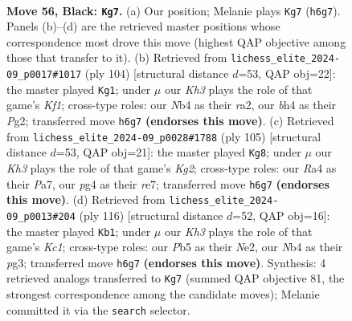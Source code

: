 \documentclass[11pt]{article}
\begin{document}
\clearpage

\begin{figure}[p]\centering
\begin{subfigure}{0.46\textwidth}\centering
\resizebox{\linewidth}{!}{%
\newchessgame
\chessboard[
  setfen={1R6/3b4/2r4k/1p6/rn4PB/1R2P2p/5P2/7K b - - 4 56},
  showmover=false,
  pgfstyle=straightmove, color=movearrow, markmove={h6-g7}
]}
\caption{}
\end{subfigure}\hfill
\begin{subfigure}{0.46\textwidth}\centering
\resizebox{\linewidth}{!}{%
\newchessgame
\chessboard[
  setfen={1b6/5r1k/R7/1P1p3p/3P3P/p2N4/r5P1/4RK2 w - - 3 53},
  showmover=false,
  pgfstyle=straightmove, color=movearrow, markmove={f1-g1}
]}
\caption{}
\end{subfigure}
\\[4pt]
\begin{subfigure}{0.46\textwidth}\centering
\resizebox{\linewidth}{!}{%
\newchessgame
\chessboard[
  setfen={8/p3R1k1/8/1P5p/1B4p1/P5P1/1nr2PK1/3r4 b - - 8 53},
  showmover=false,
  pgfstyle=straightmove, color=movearrow, markmove={g7-g8}
]}
\caption{}
\end{subfigure}\hfill
\begin{subfigure}{0.46\textwidth}\centering
\resizebox{\linewidth}{!}{%
\newchessgame
\chessboard[
  setfen={8/8/1k3p1p/1p2bP1P/1P2p3/6p1/r3N1R1/2K5 w - - 8 59},
  showmover=false,
  pgfstyle=straightmove, color=movearrow, markmove={c1-b1}
]}
\caption{}
\end{subfigure}
\caption{\textbf{Move 56, Black: \texttt{Kg7}.} (a) Our position; Melanie plays \texttt{Kg7} (\texttt{h6g7}). Panels (b)--(d) are the retrieved master positions whose correspondence most drove this move (highest QAP objective among those that transfer to it). (b) Retrieved from \texttt{lichess\_elite\_2024-09\_p0017\#1017} (ply 104) [structural distance $d$=53, QAP obj=22]: the master played \texttt{Kg1}; under $\mu$ our \emph{Kh3} plays the role of that game's \emph{Kf1}; cross-type roles: our \emph{N}b4 as their \emph{r}a2, our \emph{b}h4 as their \emph{P}g2; transferred move \texttt{h6g7} \textbf{(endorses this move)}. (c) Retrieved from \texttt{lichess\_elite\_2024-09\_p0028\#1788} (ply 105) [structural distance $d$=53, QAP obj=21]: the master played \texttt{Kg8}; under $\mu$ our \emph{Kh3} plays the role of that game's \emph{Kg2}; cross-type roles: our \emph{R}a4 as their \emph{P}a7, our \emph{p}g4 as their \emph{r}e7; transferred move \texttt{h6g7} \textbf{(endorses this move)}. (d) Retrieved from \texttt{lichess\_elite\_2024-09\_p0013\#204} (ply 116) [structural distance $d$=52, QAP obj=16]: the master played \texttt{Kb1}; under $\mu$ our \emph{Kh3} plays the role of that game's \emph{Kc1}; cross-type roles: our \emph{P}b5 as their \emph{N}e2, our \emph{N}b4 as their \emph{p}g3; transferred move \texttt{h6g7} \textbf{(endorses this move)}. Synthesis: 4 retrieved analogs transferred to \texttt{Kg7} (summed QAP objective 81, the strongest correspondence among the candidate moves); Melanie committed it via the \texttt{search} selector.}
\label{fig:thought-m111}
\end{figure}
\end{document}
